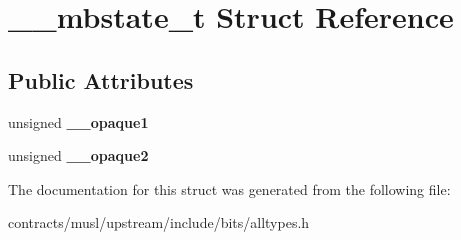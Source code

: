 \hypertarget{struct____mbstate__t}{}\section{\+\_\+\+\_\+mbstate\+\_\+t Struct Reference}
\label{struct____mbstate__t}
\subsection*{Public Attributes}
\begin{DoxyCompactItemize}
\item 
\mbox{\label{struct____mbstate__t_a30b714a3a53b2679022f0055eddea56f}} 
unsigned {\bfseries \+\_\+\+\_\+opaque1}
\item 
\mbox{\label{struct____mbstate__t_aea1368b697f4bebaf617e7f62d3863b8}} 
unsigned {\bfseries \+\_\+\+\_\+opaque2}
\end{DoxyCompactItemize}


The documentation for this struct was generated from the following file\+:\begin{DoxyCompactItemize}
\item 
contracts/musl/upstream/include/bits/alltypes.\+h\end{DoxyCompactItemize}
